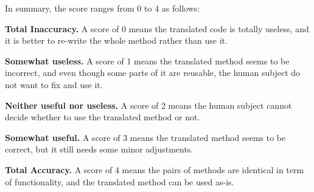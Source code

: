 
%

In summary, the score ranges from 0 to 4 as follows:

\begin{compactitem}

\item {\bf Total Inaccuracy.} A score of 0 means the translated code
  is totally useless, and it is better to re-write the whole method
  rather than use it.

\item {\bf Somewhat useless.} A score of 1 means the translated method
  seems to be incorrect, and even though some parts of it are
  reusable, the human subject do not want to fix and use it.

\item {\bf Neither useful nor useless.} A score of 2 means the human
  subject cannot decide whether to use the translated method or not.

\item {\bf Somewhat useful.} A score of 3 means the translated method
  seems to be correct, but it still needs some minor adjustments.

\item {\bf Total Accuracy.} A score of 4 means the pairs of methods are
  identical in term of functionality, and the translated method can be
  used as-is.

\end{compactitem}

